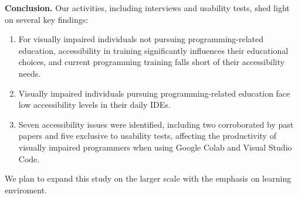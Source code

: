 {\bf Conclusion.} Our activities, including interviews and usability tests, shed light on several key findings:

\begin{enumerate}

\item For visually impaired individuals not pursuing programming-related education, accessibility in training significantly influences their educational choices, and current programming training falls short of their accessibility needs.

\item Visually impaired individuals pursuing programming-related education face low accessibility levels in their daily IDEs.

\item Seven accessibility issues were identified, including two corroborated by past papers and five exclusive to usability tests, affecting the productivity of visually impaired programmers when using Google Colab and Visual Studio Code.

\end{enumerate}

We plan to expand this study on the larger scale with the emphasis on
learning enviroment.




